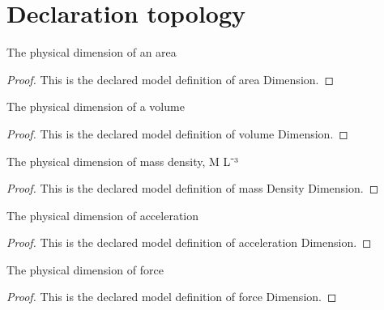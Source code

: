 \section{Declaration topology}
\begin{definition}
  \label{def:physics:phyx-mini-0386:phyxminiproblems-problemphyxmini0386-areadimension}
  The physical dimension of an area
\end{definition}
\begin{proof}
  This is the declared model definition of area Dimension.
\end{proof}
\begin{definition}
  \label{def:physics:phyx-mini-0386:phyxminiproblems-problemphyxmini0386-volumedimension}
  The physical dimension of a volume
\end{definition}
\begin{proof}
  This is the declared model definition of volume Dimension.
\end{proof}
\begin{definition}
  \label{def:physics:phyx-mini-0386:phyxminiproblems-problemphyxmini0386-massdensitydimension}
  The physical dimension of mass density, M L⁻³
\end{definition}
\begin{proof}
  This is the declared model definition of mass Density Dimension.
\end{proof}
\begin{definition}
  \label{def:physics:phyx-mini-0386:phyxminiproblems-problemphyxmini0386-accelerationdimension}
  The physical dimension of acceleration
\end{definition}
\begin{proof}
  This is the declared model definition of acceleration Dimension.
\end{proof}
\begin{definition}
  \label{def:physics:phyx-mini-0386:phyxminiproblems-problemphyxmini0386-forcedimension}
  The physical dimension of force
\end{definition}
\begin{proof}
  This is the declared model definition of force Dimension.
\end{proof}
